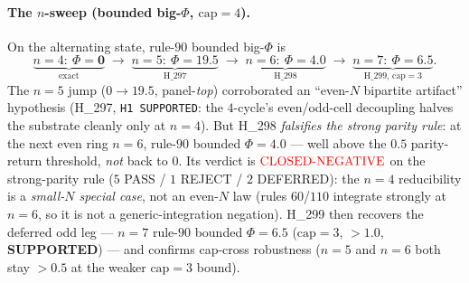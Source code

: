 \paragraph{The $n$-sweep (bounded big-$\Phi$, $\mathrm{cap}{=}4$).} On the
alternating state, rule-$90$ bounded big-$\Phi$ is
\begin{equation}
\underbrace{n{=}4:\ \Phi{=}\mathbf{0}}_{\text{exact}}
\;\rightarrow\;
\underbrace{n{=}5:\ \Phi{=}\mathbf{19.5}}_{\text{H\_297}}
\;\rightarrow\;
\underbrace{n{=}6:\ \Phi{=}\mathbf{4.0}}_{\text{H\_298}}
\;\rightarrow\;
\underbrace{n{=}7:\ \Phi{=}\mathbf{6.5}}_{\text{H\_299, } \mathrm{cap}{=}3} .
\label{eq:n-sweep}
\end{equation}
The $n{=}5$ jump ($0\!\rightarrow\!19.5$, panel-\emph{top}) corroborated an
``even-$N$ bipartite artifact'' hypothesis (H\_297, \texttt{H1 SUPPORTED}: the
$4$-cycle's even/odd-cell decoupling halves the substrate cleanly only at
$n{=}4$). But H\_298 \emph{falsifies the strong parity rule}: at the next even
ring $n{=}6$, rule-$90$ bounded $\Phi{=}\mathbf{4.0}$ --- well above the $0.5$
parity-return threshold, \emph{not} back to $0$. Its verdict is
\textbf{$\mathbf{\textcolor{red}{\text{CLOSED-NEGATIVE}}}$} on the strong-parity
rule ($5$ PASS / $1$ REJECT / $2$ DEFERRED): the $n{=}4$ reducibility is a
\emph{small-$N$ special case}, not an even-$N$ law (rules $60$/$110$ integrate
strongly at $n{=}6$, so it is not a generic-integration negation). H\_299 then
recovers the deferred odd leg --- $n{=}7$ rule-$90$ bounded $\Phi{=}\mathbf{6.5}$
($\mathrm{cap}{=}3$, $>1.0$, \textbf{SUPPORTED}) --- and confirms cap-cross
robustness ($n{=}5$ and $n{=}6$ both stay $>0.5$ at the weaker $\mathrm{cap}{=}3$
bound).

